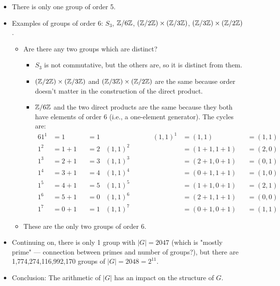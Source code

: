 \documentclass[../notes.tex]{subfiles}
\begin{document}
\begin{itemize}
    \item There is only one group of order 5.
    \item Examples of groups of order 6: $S_3$, $\mathbb{Z}/6\mathbb{Z}$, $(\mathbb{Z}/2\mathbb{Z})\times(\mathbb{Z}/3\mathbb{Z})$, $(\mathbb{Z}/3\mathbb{Z})\times(\mathbb{Z}/2\mathbb{Z})$.
    \begin{itemize}
        \item Are there any two groups which are distinct?
        \begin{itemize}
            \item $S_3$ is not commutative, but the others are, so it is distinct from them.
            \item $(\mathbb{Z}/2\mathbb{Z})\times(\mathbb{Z}/3\mathbb{Z})$ and $(\mathbb{Z}/3\mathbb{Z})\times(\mathbb{Z}/2\mathbb{Z})$ are the same because order doesn't matter in the construction of the direct product.
            \item $\mathbb{Z}/6\mathbb{Z}$ and the two direct products are the same because they both have elements of order 6 (i.e., a one-element generator). The cycles are:
            \begin{alignat*}{6}
                1^1 &= 1 &&= 1&\hspace{7em}
                    (1,1)^1 &= (1,1) &&= (1,1)\\
                1^2 &= 1+1 &&= 2&
                    (1,1)^2 &= (1+1,1+1) &&= (2,0)\\
                1^3 &= 2+1 &&= 3&
                    (1,1)^3 &= (2+1,0+1) &&= (0,1)\\
                1^4 &= 3+1 &&= 4&
                    (1,1)^4 &= (0+1,1+1) &&= (1,0)\\
                1^5 &= 4+1 &&= 5&
                    (1,1)^5 &= (1+1,0+1) &&= (2,1)\\
                1^6 &= 5+1 &&= 0&
                    (1,1)^6 &= (2+1,1+1) &&= (0,0)\\
                1^7 &= 0+1 &&= 1&
                    (1,1)^7 &= (0+1,0+1) &&= (1,1)
            \end{alignat*}
        \end{itemize}
        \item These are the only two groups of order 6.
    \end{itemize}
    \item Continuing on, there is only 1 group with $|G|=2047$ (which is "mostly prime" --- connection between primes and number of groups?), but there are 1,774,274,116,992,170 groups of $|G|=2048=2^{11}$.
    \item Conclusion: The arithmetic of $|G|$ has an impact on the structure of $G$.
\end{itemize}
\end{document}
